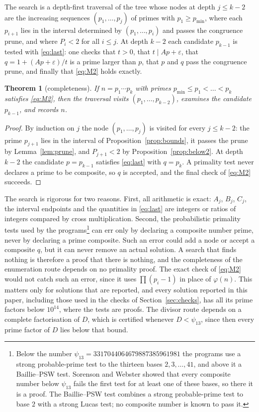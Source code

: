 \documentclass[screen,reqno]{aomart}
\numberwithin{equation}{section}
\theoremstyle{plain}
\newtheorem{theorem}{Theorem}[section]
\theoremstyle{definition}
\theoremstyle{remark}
\begin{document}
The search is a depth-first traversal of the tree whose nodes at depth
$j\le k-2$ are the increasing sequences $(p_1,\dots,p_j)$ of primes
with $p_1\ge p_{\min}$, where each $p_{i+1}$ lies in the interval
determined by $(p_1,\dots,p_i)$ and passes the congruence prune, and
where $P_i<2$ for all $i\le j$. At depth $k-2$ each candidate
$p_{k-1}$ is tested with \eqref{eq:last}: one checks that $t>0$, that
$t\mid Ap+\varepsilon$, that $q=1+(Ap+\varepsilon)/t$ is a prime larger
than $p$, that $p$ and $q$ pass the congruence prune, and finally that
\eqref{eq:M2} holds exactly.

\begin{theorem}[completeness]\label{thm:complete}
If $n=p_1\cdots p_k$ with primes $p_{\min}\le p_1<\dots<p_k$ satisfies
\eqref{eq:M2}, then the traversal visits $(p_1,\dots,p_{k-2})$,
examines the candidate $p_{k-1}$, and records $n$.
\end{theorem}

\begin{proof}
By induction on $j$ the node $(p_1,\dots,p_j)$ is visited for every
$j\le k-2$: the prime $p_{j+1}$ lies in the interval of
Proposition~\ref{prop:bounds}, it passes the prune by
Lemma~\ref{lem:prune}, and $P_{j+1}<2$ by
Proposition~\ref{prop:below2}. At depth $k-2$ the candidate
$p=p_{k-1}$ satisfies \eqref{eq:last} with $q=p_k$. A primality test
never declares a prime to be composite, so $q$ is accepted, and the
final check of \eqref{eq:M2} succeeds.
\end{proof}

The search is rigorous for two reasons. First, all arithmetic is
exact:
$A_j$, $B_j$, $C_j$, the interval endpoints and the quantities in
\eqref{eq:last} are integers or ratios of integers compared by cross
multiplication. Second, the probabilistic primality tests used by the
programs\footnote{Below the number
$\psi_{13}=3317044064679887385961981$ the programs use a strong
probable-prime test to the thirteen bases $2,3,\dots,41$, and above it
a Baillie--PSW test. Sorenson and Webster \cite{SW17} showed that
every composite number below $\psi_{13}$ fails the first test for at
least one of these bases, so there it is a proof. The
Baillie--PSW test \cite{BW80,PSW80} combines a strong probable-prime
test to base $2$ with a strong Lucas test; no composite number is
known to pass it.} can err only by declaring a composite number prime,
never by declaring a prime composite. Such an error could add a node
or accept a composite $q$, but it can never remove an actual solution.
A search that finds nothing is therefore a proof that there is
nothing, and the completeness of the enumeration route depends on no
primality proof. The exact check of \eqref{eq:M2} would not catch such
an error, since it uses $\prod(p_i-1)$ in place of $\varphi(n)$. This
matters only for solutions that are reported, and every solution
reported in this paper, including those used in the checks of
Section~\ref{sec:checks}, has all its prime factors below $10^{14}$,
where the tests are proofs. The divisor route depends on a complete
factorisation of $D$, which is certified whenever $D<\psi_{13}$,
since then every prime factor of $D$ lies below that bound.
\end{document}

